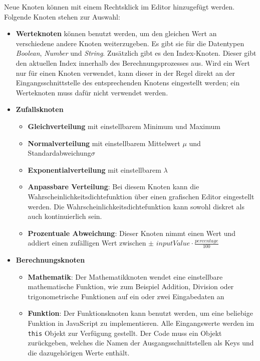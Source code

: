 Neue Knoten können mit einem Rechtsklick im Editor hinzugefügt werden. Folgende Knoten stehen zur Auswahl:

\begin{itemize}
    \item \textbf{Werteknoten} können benutzt werden, um den gleichen Wert an verschiedene andere Knoten weiterzugeben. Es gibt sie für die Datentypen \textit{Boolean}, \textit{Number} und \textit{String}. Zusätzlich gibt es den Index-Knoten. Dieser gibt den aktuellen Index innerhalb des Berechnungsprozesses aus. Wird ein Wert nur für einen Knoten verwendet, kann dieser in der Regel direkt an der Eingangsschnittstelle des entsprechenden Knotens eingestellt werden; ein Werteknoten muss dafür nicht verwendet werden.
    \item \textbf{Zufallsknoten}
    \begin{itemize}
        \item \textbf{Gleichverteilung} mit einstellbarem Minimum und Maximum
        \item \textbf{Normalverteilung} mit einstellbarem Mittelwert $\mu$ und Standardabweichung\nobreakspace $\sigma$
        \item \textbf{Exponentialverteilung} mit einstellbarem $\lambda$
        \item \textbf{Anpassbare Verteilung}: Bei diesem Knoten kann die Wahrscheinlichkeitsdichtefunktion über einen grafischen Editor eingestellt werden. Die Wahrscheinlichkeitsdichtefunktion kann sowohl diskret als auch kontinuierlich sein.
        \item \textbf{Prozentuale Abweichung}: Dieser Knoten nimmt einen Wert und addiert einen zufälligen Wert zwischen $\pm \, \, inputValue \cdot \frac{percentage}{100}$
    \end{itemize}
    \item \textbf{Berechnungsknoten}
    \begin{itemize}
        \item \textbf{Mathematik}: Der Mathematikknoten wendet eine einstellbare mathematische Funktion, wie zum Beispiel Addition, Division oder trigonometrische Funktionen auf ein oder zwei Eingabedaten an
        \item \textbf{Funktion}: Der Funktionsknoten kann benutzt werden, um eine beliebige Funktion in JavaScript zu implementieren. Alle Eingangswerte werden im \texttt{this} Objekt zur Verfügung gestellt. Der Code muss ein Objekt zurückgeben, welches die Namen der Ausgangsschnittstellen als Keys und die dazugehörigen Werte enthält.

\end{itemize}
\end{itemize}

